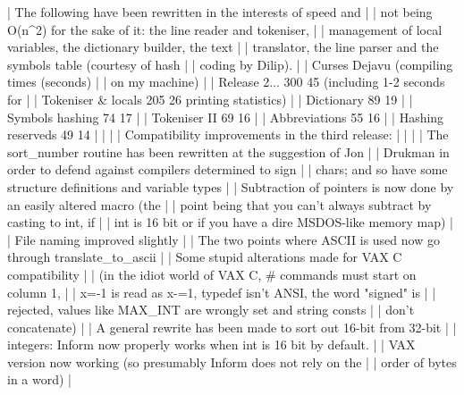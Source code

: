 |     The following have been rewritten in the interests of speed and       |
|       not being O(n^2) for the sake of it: the line reader and tokeniser, |
|       management of local variables, the dictionary builder, the text     |
|       translator, the line parser and the symbols table (courtesy of hash |
|       coding by Dilip).                                                   |
|                         Curses    Dejavu       (compiling times (seconds) |
|                                                 on my machine)            |
|        Release 2...        300        45       (including 1-2 seconds for |
|        Tokeniser & locals  205        26        printing statistics)      |
|        Dictionary           89        19                                  |
|        Symbols hashing      74        17                                  |
|        Tokeniser II         69        16                                  |
|        Abbreviations        55        16                                  |
|        Hashing reserveds    49        14                                  |
|                                                                           |
|   Compatibility improvements in the third release:                        |
|                                                                           |
|     The sort_number routine has been rewritten at the suggestion of Jon   |
|       Drukman in order to defend against compilers determined to sign     |
|       chars; and so have some structure definitions and variable types    |
|     Subtraction of pointers is now done by an easily altered macro (the   |
|       point being that you can't always subtract by casting to int, if    |
|       int is 16 bit or if you have a dire MSDOS-like memory map)          |
|     File naming improved slightly                                         |
|     The two points where ASCII is used now go through translate_to_ascii  |
|     Some stupid alterations made for VAX C compatibility                  |
|       (in the idiot world of VAX C, # commands must start on column 1,    |
|       x=-1 is read as x-=1, typedef isn't ANSI, the word "signed" is      |
|       rejected, values like MAX_INT are wrongly set and string consts     |
|       don't concatenate)                                                  |
|     A general rewrite has been made to sort out 16-bit from 32-bit        |
|       integers: Inform now properly works when int is 16 bit by default.  |
|     VAX version now working (so presumably Inform does not rely on the    |
|       order of bytes in a word)                                           |
